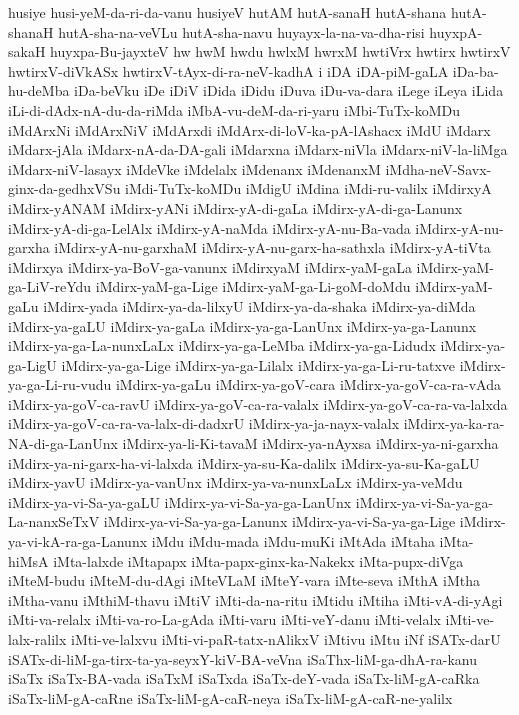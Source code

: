 {husiye
husi-yeM-da-ri-da-vanu
husiyeV
hutAM
hutA-sanaH
hutA-shana
hutA-shanaH
hutA-sha-na-veVLu
hutA-sha-navu
huyayx-la-na-va-dha-risi
huyxpA-sakaH
huyxpa-Bu-jayxteV
hw
hwM
hwdu
hwlxM
hwrxM
hwtiVrx
hwtirx
hwtirxV
hwtirxV-diVkASx
hwtirxV-tAyx-di-ra-neV-kadhA
i
iDA
iDA-piM-gaLA
iDa-ba-hu-deMba
iDa-beVku
iDe
iDiV
iDida
iDidu
iDuva
iDu-va-dara
iLege
iLeya
iLida
iLi-di-dAdx-nA-du-da-riMda
iMbA-vu-deM-da-ri-yaru
iMbi-TuTx-koMDu
iMdArxNi
iMdArxNiV
iMdArxdi
iMdArx-di-loV-ka-pA-lAshacx
iMdU
iMdarx
iMdarx-jAla
iMdarx-nA-da-DA-gali
iMdarxna
iMdarx-niVla
iMdarx-niV-la-liMga
iMdarx-niV-lasayx
iMdeVke
iMdelalx
iMdenanx
iMdenanxM
iMdha-neV-Savx-ginx-da-gedhxVSu
iMdi-TuTx-koMDu
iMdigU
iMdina
iMdi-ru-valilx
iMdirxyA
iMdirx-yANAM
iMdirx-yANi
iMdirx-yA-di-gaLa
iMdirx-yA-di-ga-Lanunx
iMdirx-yA-di-ga-LelAlx
iMdirx-yA-naMda
iMdirx-yA-nu-Ba-vada
iMdirx-yA-nu-garxha
iMdirx-yA-nu-garxhaM
iMdirx-yA-nu-garx-ha-sathxla
iMdirx-yA-tiVta
iMdirxya
iMdirx-ya-BoV-ga-vanunx
iMdirxyaM
iMdirx-yaM-gaLa
iMdirx-yaM-ga-LiV-reYdu
iMdirx-yaM-ga-Lige
iMdirx-yaM-ga-Li-goM-doMdu
iMdirx-yaM-gaLu
iMdirx-yada
iMdirx-ya-da-lilxyU
iMdirx-ya-da-shaka
iMdirx-ya-diMda
iMdirx-ya-gaLU
iMdirx-ya-gaLa
iMdirx-ya-ga-LanUnx
iMdirx-ya-ga-Lanunx
iMdirx-ya-ga-La-nunxLaLx
iMdirx-ya-ga-LeMba
iMdirx-ya-ga-Lidudx
iMdirx-ya-ga-LigU
iMdirx-ya-ga-Lige
iMdirx-ya-ga-Lilalx
iMdirx-ya-ga-Li-ru-tatxve
iMdirx-ya-ga-Li-ru-vudu
iMdirx-ya-gaLu
iMdirx-ya-goV-cara
iMdirx-ya-goV-ca-ra-vAda
iMdirx-ya-goV-ca-ravU
iMdirx-ya-goV-ca-ra-valalx
iMdirx-ya-goV-ca-ra-va-lalxda
iMdirx-ya-goV-ca-ra-va-lalx-di-dadxrU
iMdirx-ya-ja-nayx-valalx
iMdirx-ya-ka-ra-NA-di-ga-LanUnx
iMdirx-ya-li-Ki-tavaM
iMdirx-ya-nAyxsa
iMdirx-ya-ni-garxha
iMdirx-ya-ni-garx-ha-vi-lalxda
iMdirx-ya-su-Ka-dalilx
iMdirx-ya-su-Ka-gaLU
iMdirx-yavU
iMdirx-ya-vanUnx
iMdirx-ya-va-nunxLaLx
iMdirx-ya-veMdu
iMdirx-ya-vi-Sa-ya-gaLU
iMdirx-ya-vi-Sa-ya-ga-LanUnx
iMdirx-ya-vi-Sa-ya-ga-La-nanxSeTxV
iMdirx-ya-vi-Sa-ya-ga-Lanunx
iMdirx-ya-vi-Sa-ya-ga-Lige
iMdirx-ya-vi-kA-ra-ga-Lanunx
iMdu
iMdu-mada
iMdu-muKi
iMtAda
iMtaha
iMta-hiMsA
iMta-lalxde
iMtapapx
iMta-papx-ginx-ka-Nakekx
iMta-pupx-diVga
iMteM-budu
iMteM-du-dAgi
iMteVLaM
iMteY-vara
iMte-seva
iMthA
iMtha
iMtha-vanu
iMthiM-thavu
iMtiV
iMti-da-na-ritu
iMtidu
iMtiha
iMti-vA-di-yAgi
iMti-va-relalx
iMti-va-ro-La-gAda
iMti-varu
iMti-veY-danu
iMti-velalx
iMti-ve-lalx-ralilx
iMti-ve-lalxvu
iMti-vi-paR-tatx-nAlikxV
iMtivu
iMtu
iNf
iSATx-darU
iSATx-di-liM-ga-tirx-ta-ya-seyxY-kiV-BA-veVna
iSaThx-liM-ga-dhA-ra-kanu
iSaTx
iSaTx-BA-vada
iSaTxM
iSaTxda
iSaTx-deY-vada
iSaTx-liM-gA-caRka
iSaTx-liM-gA-caRne
iSaTx-liM-gA-caR-neya
iSaTx-liM-gA-caR-ne-yalilx
}
